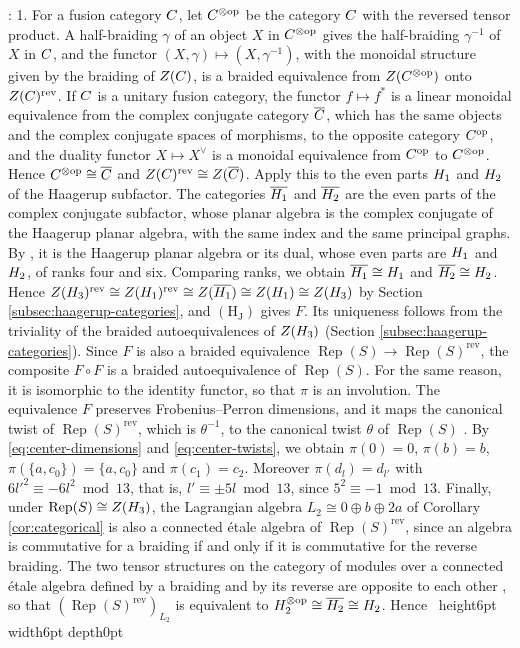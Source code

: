 \documentclass[leqno]{article}
\let\cal\relax
\newcommand{\cal}{\mathcal}
\newcommand{\qed}{\hfill \vrule height6pt  width6pt depth0pt}
\newcommand{\ot}{\otimes}
\newcommand{\ovl}{\overline}
\DeclareMathOperator{\Rep}{Rep} %
\newenvironment{proof}[1][]{\noindent {\it Proof #1} : }{\hbox{~}\qed
\smallskip
}
\numberwithin{equation}{section}
\begin{document}
\begin{proof}
1. For a fusion category $\cal C$, let $\cal C^{\ot\mathrm{op}}$ be the category $\cal C$ with the reversed tensor product. A half-braiding $\gamma$ of an object $X$ in $\cal C^{\ot\mathrm{op}}$ gives the half-braiding $\gamma^{-1}$ of $X$ in $\cal C$, and the functor $(X,\gamma) \mapsto (X,\gamma^{-1})$, with the monoidal structure given by the braiding of $Z(\cal C)$, is a braided equivalence from $Z(\cal C^{\ot\mathrm{op}})$ onto $Z(\cal C)^{\mathrm{rev}}$. If $\cal C$ is a unitary fusion category, the functor $f \mapsto f^*$ is a linear monoidal equivalence from the complex conjugate category $\ovl{\cal C}$, which has the same objects and the complex conjugate spaces of morphisms, to the opposite category $\cal C^{\mathrm{op}}$, and the duality functor $X \mapsto X^\vee$ is a monoidal equivalence from $\cal C^{\mathrm{op}}$ to $\cal C^{\ot\mathrm{op}}$. Hence $\cal C^{\ot\mathrm{op}} \cong \ovl{\cal C}$ and $Z(\cal C)^{\mathrm{rev}} \cong Z(\ovl{\cal C})$. Apply this to the even parts $\cal H_1$ and $\cal H_2$ of the Haagerup subfactor. The categories $\ovl{\cal H_1}$ and $\ovl{\cal H_2}$ are the even parts of the complex conjugate subfactor, whose planar algebra is the complex conjugate of the Haagerup planar algebra, with the same index and the same principal graphs. By \cite[Theorem 4.1 p.~21]{JMS14}, it is the Haagerup planar algebra or its dual, whose even parts are $\cal H_1$ and $\cal H_2$, of ranks four and six. Comparing ranks, we obtain $\ovl{\cal H_1} \cong \cal H_1$ and $\ovl{\cal H_2} \cong \cal H_2$. Hence $Z(\cal H_3)^{\mathrm{rev}} \cong Z(\cal H_1)^{\mathrm{rev}} \cong Z(\ovl{\cal H_1}) \cong Z(\cal H_1) \cong Z(\cal H_3)$ by Section \ref{subsec:haagerup-categories}, and $\mathrm{(H_J)}$ gives $F$. Its uniqueness follows from the triviality of the braided autoequivalences of $Z(\cal H_3)$ (Section \ref{subsec:haagerup-categories}). Since $F$ is also a braided equivalence $\Rep(S) \to \Rep(S)^{\mathrm{rev}}$, the composite $F \circ F$ is a braided autoequivalence of $\Rep(S)$. For the same reason, it is isomorphic to the identity functor, so that $\pi$ is an involution. The equivalence $F$ preserves Frobenius--Perron dimensions, and it maps the canonical twist of $\Rep(S)^{\mathrm{rev}}$, which is $\theta^{-1}$, to the canonical twist $\theta$ of $\Rep(S)$ \cite[Proposition 8.23 p.~34]{ENO05}. By \eqref{eq:center-dimensions} and \eqref{eq:center-twists}, we obtain $\pi(0) = 0$, $\pi(b) = b$, $\pi(\{a,c_0\}) = \{a,c_0\}$ and $\pi(c_1) = c_2$. Moreover $\pi(d_l) = d_{l'}$ with $6l'^2 \equiv -6l^2 \bmod 13$, that is, $l' \equiv \pm 5l \bmod 13$, since $5^2 \equiv -1 \bmod 13$. Finally, under $\Rep(S) \cong Z(\cal H_3)$, the Lagrangian algebra $L_2 \cong 0 \oplus b \oplus 2a$ of Corollary \ref{cor:categorical} is also a connected \'etale algebra of $\Rep(S)^{\mathrm{rev}}$, since an algebra is commutative for a braiding if and only if it is commutative for the reverse braiding. The two tensor structures on the category of modules over a connected \'etale algebra defined by a braiding and by its reverse are opposite to each other \cite[p.~9]{DMNO13}, so that $(\Rep(S)^{\mathrm{rev}})_{L_2}$ is equivalent to $\cal H_2^{\ot\mathrm{op}} \cong \ovl{\cal H_2} \cong \cal H_2$. Hence 
\end{proof}
\end{document}
